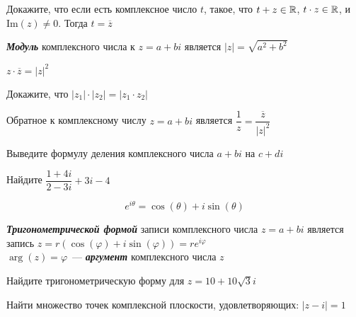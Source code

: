 \documentclass{article}
\begin{document}
\begin{task_boxed}
	Докажите, что если есть комплексное число $t$, такое, что $t + z \in \mathbb{R}$, $t \cdot z \in \mathbb{R}$, и $\text{Im}(z) \neq 0$. Тогда $t = \overline{z}$
\end{task_boxed}

\begin{definition_boxed}
	\textbf{\textit{Модуль}} комплексного числа к $z = a + bi$ является $|z| = \sqrt{a^2 + b^2}$
\end{definition_boxed}

\begin{example}
	$z \cdot \overline{z} = |z|^2$
\end{example}

\begin{task_boxed}
	Докажите, что $|z_1|\cdot|z_2| = |z_1\cdot z_2|$
\end{task_boxed}

\begin{definition_boxed}
	Обратное к комплексному числу $z = a + bi$ является $\dfrac{1}{z} = \dfrac{\overline{z}}{|z|^2}$
\end{definition_boxed}

\begin{task_boxed}
	Выведите формулу деления комплексного числа $a + bi$ на $c + di$
\end{task_boxed}

\begin{task_boxed}
	Найдите $\dfrac{1+4i}{2-3i} + 3i - 4$
\end{task_boxed}

\begin{theorem_boxed}[ Эйлера]
	\[e^{i\theta} = \cos(\theta) + i\sin(\theta)\]
\end{theorem_boxed}

\begin{definition_boxed}
	\textbf{\textit{Тригонометрической формой}} записи комплексного числа $z = a + bi$ является запись $z = r(\cos(\varphi) + i \sin(\varphi)) = re^{i\varphi}$\\
	$\arg(z) = \varphi$~--- \textbf{\textit{аргумент}} комплексного числа $z$
\end{definition_boxed}

\begin{task_boxed}
Найдите тригонометрическую форму для $z=10+10\sqrt{3}i$
\end{task_boxed}

\begin{task_boxed}
	Найти множество точек комплексной плоскости, удовлетворяющих: $|z-i| = 1$
\end{task_boxed}
\end{document}
